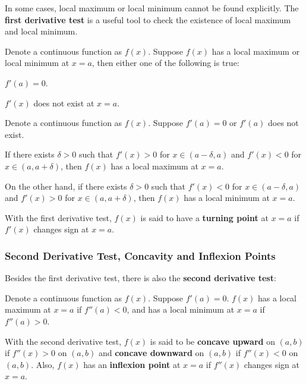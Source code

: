 \documentclass[a4paper,12pt]{article}
\begin{document}
In some cases, local maximum or local minimum cannot be found explicitly. The \textbf{first derivative test} is a useful tool to check the existence of local maximum and local minimum.\n

\begin{pst}
  Denote a continuous function as $f(x)$. Suppose $f(x)$ has a local maximum or local minimum at $x=a$, then either one of the following is true:

  \begin{alist}
    \item $f'(a)=0$.

    \item $f'(x)$ does not exist at $x=a$.
  \end{alist}
\end{pst}\n

\begin{pst}
  Denote a continuous function as $f(x)$. Suppose $f'(a)=0$ or $f'(a)$ does not exist.\n

   If there exists $\delta>0$ such that $f'(x)>0$ for $x\in(a-\delta,a)$ and $f'(x)<0$ for $x\in(a,a+\delta)$, then $f(x)$ has a local maximum at $x=a$.\n

   On the other hand, if there exists $\delta>0$ such that $f'(x)<0$ for $x\in(a-\delta,a)$ and $f'(x)>0$ for $x\in(a,a+\delta)$, then $f(x)$ has a local minimum at $x=a$.
\end{pst}\n

\begin{dft}
  With the first derivative test, $f(x)$ is said to have a \textbf{turning point} at $x=a$ if $f'(x)$ changes sign at $x=a$.
\end{dft}

\subsubsection{Second Derivative Test, Concavity and Inflexion Points}
Besides the first derivative test, there is also the \textbf{second derivative test}:\n

\propdisp

\begin{pst}
  Denote a continuous function as $f(x)$. Suppose $f'(a)=0$. $f(x)$ has a local maximum at $x=a$ if $f''(a)<0$, and has a local minimum at $x=a$ if $f''(a)>0$.
\end{pst}\n

\begin{dft}
  With the second derivative test, $f(x)$ is said to be \textbf{concave upward} on $(a,b)$ if $f''(x)>0$ on $(a,b)$ and \textbf{concave downward} on $(a,b)$ if $f''(x)<0$ on $(a,b)$. Also, $f(x)$ has an \textbf{inflexion point} at $x=a$ if $f''(x)$ changes sign at $x=a$.
\end{dft}
\end{document}
